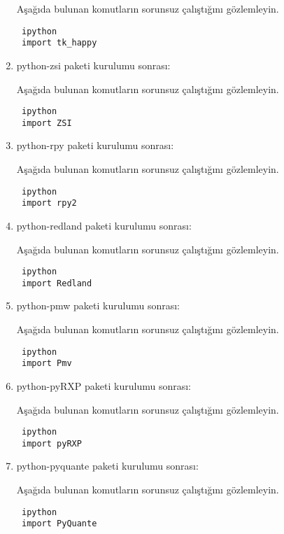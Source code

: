 \documentclass[a4paper,10pt]{article}
\begin{document}
\begin{enumerate}
Aşağıda bulunan komutların sorunsuz çalıştığını gözlemleyin.

\begin{verbatim}
 ipython
 import tk_happy
\end{verbatim}

\item python-zsi paketi kurulumu sonrası:

Aşağıda bulunan komutların sorunsuz çalıştığını gözlemleyin.

\begin{verbatim}
 ipython
 import ZSI
\end{verbatim}


\item python-rpy paketi kurulumu sonrası:

Aşağıda bulunan komutların sorunsuz çalıştığını gözlemleyin.

\begin{verbatim}
 ipython
 import rpy2
\end{verbatim}

\item python-redland paketi kurulumu sonrası:

Aşağıda bulunan komutların sorunsuz çalıştığını gözlemleyin.

\begin{verbatim}
 ipython
 import Redland
\end{verbatim}

\item python-pmw paketi kurulumu sonrası:

Aşağıda bulunan komutların sorunsuz çalıştığını gözlemleyin.

\begin{verbatim}
 ipython
 import Pmv
\end{verbatim}

\item python-pyRXP paketi kurulumu sonrası:

Aşağıda bulunan komutların sorunsuz çalıştığını gözlemleyin.

\begin{verbatim}
 ipython
 import pyRXP
\end{verbatim}

\item python-pyquante paketi kurulumu sonrası:

Aşağıda bulunan komutların sorunsuz çalıştığını gözlemleyin.

\begin{verbatim}
 ipython
 import PyQuante
\end{verbatim}


\end{enumerate}
\end{document}
